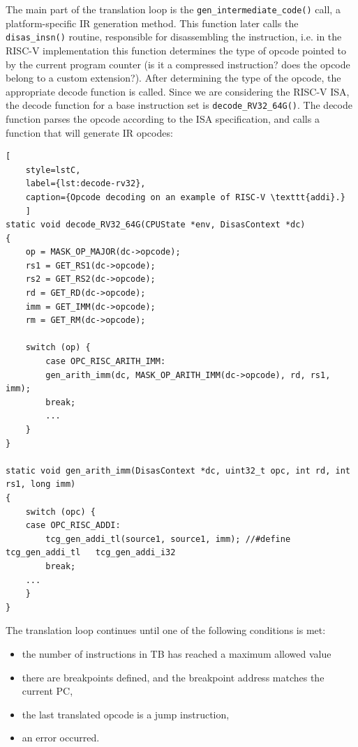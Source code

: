 The main part of the translation loop is the \texttt{gen\_intermediate\_code()} call, a platform-specific
IR generation method. This function later calls the \texttt{disas\_insn()} routine, responsible for disassembling
the instruction, i.e. in the RISC-V implementation this function determines the type of opcode pointed to by the current
program counter (is it a compressed instruction? does the opcode belong to a custom extension?). After determining
the type of the opcode, the appropriate decode function is called. Since we are considering the RISC-V ISA, the decode function for a base instruction set
is \texttt{decode\_RV32\_64G()}. The decode function parses the opcode according to the ISA specification, and calls a
function that will generate IR opcodes:

\begin{lstlisting}[
    style=lstC,
    label={lst:decode-rv32},
    caption={Opcode decoding on an example of RISC-V \texttt{addi}.}
    ]
static void decode_RV32_64G(CPUState *env, DisasContext *dc)
{
    op = MASK_OP_MAJOR(dc->opcode);
    rs1 = GET_RS1(dc->opcode);
    rs2 = GET_RS2(dc->opcode);
    rd = GET_RD(dc->opcode);
    imm = GET_IMM(dc->opcode);
    rm = GET_RM(dc->opcode);

    switch (op) {
        case OPC_RISC_ARITH_IMM:
        gen_arith_imm(dc, MASK_OP_ARITH_IMM(dc->opcode), rd, rs1, imm);
        break;
        ...
    }
}

static void gen_arith_imm(DisasContext *dc, uint32_t opc, int rd, int rs1, long imm)
{
    switch (opc) {
    case OPC_RISC_ADDI:
        tcg_gen_addi_tl(source1, source1, imm); //#define tcg_gen_addi_tl   tcg_gen_addi_i32
        break;
    ...
    }
}
\end{lstlisting}

\noindent
The translation loop continues until one of the following conditions is met:
\begin{itemize}
    \item{the number of instructions in TB has reached a maximum allowed value}
    \item{there are breakpoints defined, and the breakpoint address matches the current PC,}
    \item{the last translated opcode is a jump instruction,}
    \item{an error occurred.}
\end{itemize}

